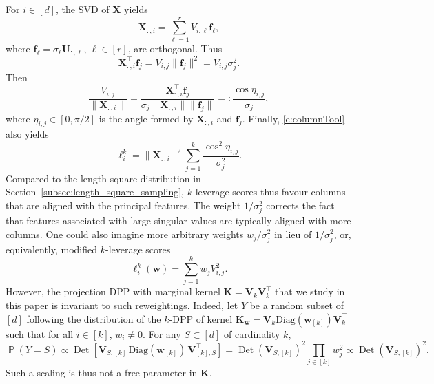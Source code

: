 \documentclass[twoside,11pt]{book}
\numberwithin{theorem}{chapter}
\numberwithin{definition}{chapter}
\numberwithin{proposition}{chapter}
\numberwithin{corollary}{chapter}
\numberwithin{example}{chapter}
\numberwithin{lemma}{chapter}
\numberwithin{assumption}{chapter}
\numberwithin{equation}{chapter}
\numberwithin{figure}{chapter}
\DeclareMathOperator{\Det}{Det}
\DeclareMathOperator{\Tran}{\intercal}
\DeclareMathOperator{\Prb}{\mathbb{P}}
\begin{document}
\begin{subappendices}
For $i \in [d]$, the SVD of $\bm{X}$ yields
\begin{equation}
\bm{X}_{:,i} = \sum_{\ell = 1}^{r}V_{i,\ell}\bm{f}_{\ell},
\end{equation}
where $\bm{f}_{\ell} = \sigma_{\ell}\bm{U}_{:,\ell}$, $\ell\in[r]$, are orthogonal.
Thus
\begin{equation}
\bm{X}_{:,i}^{\Tran}\bm{f}_{j} = V_{i,j} \|\bm{f}_{j}\|^{2} = V_{i,j} \sigma_{j}^{2}.
\label{e:columnTool}
\end{equation}
Then
\begin{equation}
 \frac{V_{i,j}}{\|\bm{X}_{:,i}\|} = \frac{\bm{X}_{:,i}^{\Tran}\bm{f}_{j}}{\sigma_{j}\|\bm{X}_{:,i}\|\|\bm{f}_{j}\|} =:  \frac{\cos \eta_{i,j}}{\sigma_{j}},
\end{equation}
where $\eta_{i,j}\in[0,\pi/2]$ is the angle formed by $\bm{X}_{:,i}$ and $\bm{f}_j$. Finally, \eqref{e:columnTool} also yields
\begin{equation}
\ell^{k}_{i} = \|\bm{X}_{:,i}\|^{2} \sum_{j=1}^{k} \frac{\cos^2\eta_{i,j}}{\sigma_{j}^{2}}.
\end{equation}
Compared to the length-square distribution in Section~\ref{subsec:length_square_sampling}, $k$-leverage scores thus favour columns that are aligned with the principal features. The weight $1/\sigma_j^2$ corrects the fact that features associated with large singular values are typically aligned with more columns. One could also imagine more arbitrary weights $w_j/\sigma_j^2$ in lieu of $1/\sigma_j^2$, or, equivalently, modified $k$-leverage scores
$$\ell_i^k(\bm{w}) = \sum_{j=1}^k w_{j}V_{i,j}^2.$$
However, the projection DPP with marginal kernel $\bm{K} = \bm{V}^{}_{k}\bm{V}_{k}^{\Tran}$ that we study in this paper is invariant to such reweightings. Indeed,  let $Y$ be a random subset of $[d]$ following the distribution of the $k$-DPP of kernel $\bm{K}_{\bm{w}} = \bm{V}^{}_{k}\text{Diag}(\bm{w}_{[k]})\bm{V}_{k}^{\Tran}$ such that for all $i \in [k]$, $w_{i} \neq 0$. For any $S\subset [d]$ of cardinality $k$,
\begin{equation}
\Prb (Y=S) \propto \Det \left[\bm{V}^{}_{S, [k]} \,\text{Diag}(\bm{w}_{[k]})\, \bm{V}_{[k],S}^{\Tran}\right] = \Det(\bm{V}_{S,[k]})^{2} \prod\limits_{j \in [k]} w_{j}^{2}\propto \Det(\bm{V}_{S,[k]})^{2}.
\end{equation}
Such a scaling is thus not a free parameter in $\bm{K}$.

\end{subappendices}
\end{document}
